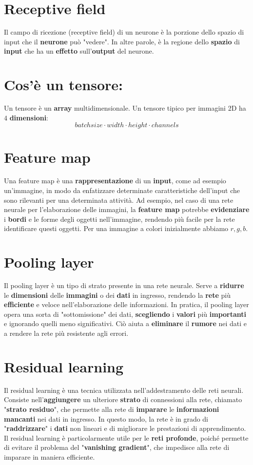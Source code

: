 \documentclass{article}
\begin{document}
\section{Receptive field}   
Il campo di ricezione (receptive field) di un neurone è la porzione dello spazio di input che il \textbf{neurone} può "vedere". In altre parole, è la regione dello \textbf{spazio} di \textbf{input} che ha un \textbf{effetto} sull'\textbf{output} del neurone.

\section{Cos'è un tensore:}
Un tensore è un \textbf{array} multidimensionale. Un tensore tipico per immagini 2D  ha $4$ \textbf{dimensioni}:
$$batchsize \cdot width \cdot height \cdot channels$$

\section{Feature map}
Una feature map è una \textbf{rappresentazione} di un \textbf{input}, come ad esempio un'immagine, in modo da enfatizzare determinate caratteristiche dell'input che sono rilevanti per una determinata attività. Ad esempio, nel caso di una rete neurale per l'elaborazione delle immagini, la \textbf{feature map} potrebbe \textbf{evidenziare} i \textbf{bordi} e le forme degli oggetti nell'immagine, rendendo più facile per la rete identificare questi oggetti.
Per una immagine a colori inizialmente abbiamo $r,g,b$.

\section{Pooling layer}
Il pooling layer è un tipo di strato presente in una rete neurale. Serve a \textbf{ridurre} le \textbf{dimensioni} delle \textbf{immagini} o dei \textbf{dati} in ingresso, rendendo la \textbf{rete} più \textbf{efficiente} e veloce nell'elaborazione delle informazioni. In pratica, il pooling layer opera una sorta di "sottomissione" dei dati, \textbf{scegliendo} i \textbf{valori} più \textbf{importanti} e ignorando quelli meno significativi. Ciò aiuta a \textbf{eliminare} il \textbf{rumore} nei dati e a rendere la rete più resistente agli errori.

\section{Residual learning}
Il residual learning è una tecnica utilizzata nell'addestramento delle reti neurali. Consiste nell'\textbf{aggiungere} un ulteriore \textbf{strato} di connessioni alla rete, chiamato "\textbf{strato residuo}", che permette alla rete di \textbf{imparare} le \textbf{informazioni} \textbf{mancanti} nei dati in ingresso. In questo modo, la rete è in grado di "\textbf{raddrizzare}" i \textbf{dati} non lineari e di migliorare le prestazioni di apprendimento. Il residual learning è particolarmente utile per le \textbf{reti profonde}, poiché permette di evitare il problema del "\textbf{vanishing gradient}", che impedisce alla rete di imparare in maniera efficiente.
\end{document}
